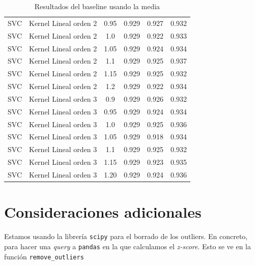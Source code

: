 \documentclass[11pt]{article}
\begin{document}
\begin{table}[H]
\begin{tabular}{|c|c|c|c|c|c|}
    SVC & Kernel Lineal orden 2 & 0.95 & 0.929 & 0.927 & 0.932 \\
    SVC & Kernel Lineal orden 2 & 1.0 & 0.929 & 0.922 & 0.933 \\
    SVC & Kernel Lineal orden 2 & 1.05 & 0.929 & 0.924 & 0.934 \\
    SVC & Kernel Lineal orden 2 & 1.1 & 0.929 & 0.925 & 0.937 \\
    SVC & Kernel Lineal orden 2 & 1.15 & 0.929 & 0.925 & 0.932 \\
    SVC & Kernel Lineal orden 2 & 1.2 & 0.929 & 0.922 & 0.934 \\
    SVC & Kernel Lineal orden 3 & 0.9 & 0.929 & 0.926 & 0.932 \\
    SVC & Kernel Lineal orden 3 & 0.95 & 0.929 & 0.924 & 0.934 \\
    SVC & Kernel Lineal orden 3 & 1.0 & 0.929 & 0.925 & 0.936 \\
    SVC & Kernel Lineal orden 3 & 1.05 & 0.929 & 0.918 & 0.934 \\
    SVC & Kernel Lineal orden 3 & 1.1 & 0.929 & 0.925 & 0.932 \\
    SVC & Kernel Lineal orden 3 & 1.15 & 0.929 & 0.923 & 0.935 \\
    SVC & Kernel Lineal orden 3 & 1.20 & 0.929 & 0.924 & 0.936 \\
    \hline
\end{tabular}
    \caption{Resultados del baseline usando la media}
\end{table}



\pagebreak

\section{Consideraciones adicionales} \label{consideraciones}

Estamos usando la librería \lstinline{scipy} para el borrado de los outliers. En concreto, para hacer una \emph{query} a \lstinline{pandas} en la que calculamos el \emph{z-score}. Esto se ve en la función \lstinline{remove_outliers}


\pagebreak


\end{document}
